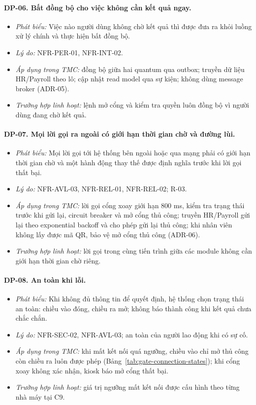 \paragraph{DP-06. Bất đồng bộ cho việc không cần kết quả ngay.}\label{dp:06}
\begin{itemize}
    \item \textit{Phát biểu:} Việc nào người dùng không chờ kết quả thì được đưa ra khỏi luồng xử lý chính và thực hiện bất đồng bộ.
    \item \textit{Lý do:} NFR-PER-01, NFR-INT-02.
    \item \textit{Áp dụng trong TMC:} đồng bộ giữa hai quantum qua outbox; truyền dữ liệu HR/Payroll theo lô; cập nhật read model qua sự kiện; không dùng message broker (ADR-05).
    \item \textit{Trường hợp linh hoạt:} lệnh mở cổng và kiểm tra quyền luôn đồng bộ vì người dùng đang chờ kết quả.
\end{itemize}

\paragraph{DP-07. Mọi lời gọi ra ngoài có giới hạn thời gian chờ và đường lùi.}\label{dp:07}
\begin{itemize}
    \item \textit{Phát biểu:} Mọi lời gọi tới hệ thống bên ngoài hoặc qua mạng phải có giới hạn thời gian chờ và một hành động thay thế được định nghĩa trước khi lời gọi thất bại.
    \item \textit{Lý do:} NFR-AVL-03, NFR-REL-01, NFR-REL-02; R-03.
    \item \textit{Áp dụng trong TMC:} lời gọi cổng xoay giới hạn 800 ms, kiểm tra trạng thái trước khi gửi lại, circuit breaker và mở cổng thủ công; truyền HR/Payroll gửi lại theo exponential backoff và cho phép gửi lại thủ công; khi nhân viên không lấy được mã QR, bảo vệ mở cổng thủ công (ADR-06).
    \item \textit{Trường hợp linh hoạt:} lời gọi trong cùng tiến trình giữa các module không cần giới hạn thời gian chờ riêng.
\end{itemize}

\paragraph{DP-08. An toàn khi lỗi.}\label{dp:08}
\begin{itemize}
    \item \textit{Phát biểu:} Khi không đủ thông tin để quyết định, hệ thống chọn trạng thái an toàn: chiều vào đóng, chiều ra mở; không báo thành công khi kết quả chưa chắc chắn.
    \item \textit{Lý do:} NFR-SEC-02, NFR-AVL-03; an toàn của người lao động khi có sự cố.
    \item \textit{Áp dụng trong TMC:} khi mất kết nối quá ngưỡng, chiều vào chỉ mở thủ công còn chiều ra luôn được phép (Bảng~\ref{tab:gate-connection-states}); khi cổng xoay không xác nhận, kiosk báo mở cổng thất bại.
    \item \textit{Trường hợp linh hoạt:} giá trị ngưỡng mất kết nối được cấu hình theo từng nhà máy tại C9.
\end{itemize}

